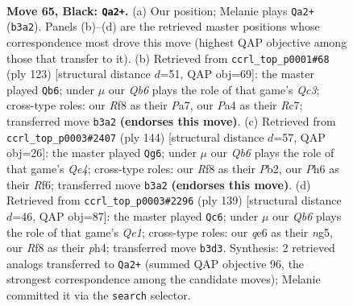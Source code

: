 \documentclass[11pt]{article}
\begin{document}
\clearpage

\begin{figure}[p]\centering
\begin{subfigure}{0.46\textwidth}\centering
\resizebox{\linewidth}{!}{%
\newchessgame
\chessboard[
  setfen={5r1r/p5p1/4Q2p/1k1p3P/p2P2P1/1q2P3/6KN/4b3 b - - 39 65},
  showmover=false,
  pgfstyle=straightmove, color=movearrow, markmove={b3-a2}
]}
\caption{}
\end{subfigure}\hfill
\begin{subfigure}{0.46\textwidth}\centering
\resizebox{\linewidth}{!}{%
\newchessgame
\chessboard[
  setfen={8/p1r1k1p1/P1q2p2/7P/4P3/3Q2P1/2p2P2/2R3K1 b - - 0 62},
  showmover=false,
  pgfstyle=straightmove, color=movearrow, markmove={c6-b6}
]}
\caption{}
\end{subfigure}
\\[4pt]
\begin{subfigure}{0.46\textwidth}\centering
\resizebox{\linewidth}{!}{%
\newchessgame
\chessboard[
  setfen={8/4q3/1k1pPR2/1np5/p3Q3/Pp1P4/1P6/2K5 w - - 1 73},
  showmover=false,
  pgfstyle=straightmove, color=movearrow, markmove={e4-g6}
]}
\caption{}
\end{subfigure}\hfill
\begin{subfigure}{0.46\textwidth}\centering
\resizebox{\linewidth}{!}{%
\newchessgame
\chessboard[
  setfen={4q1k1/4r3/4p3/1p2QpN1/p6P/P2P2P1/1P3P1K/8 b - - 28 70},
  showmover=false,
  pgfstyle=straightmove, color=movearrow, markmove={e8-c6}
]}
\caption{}
\end{subfigure}
\caption{\textbf{Move 65, Black: \texttt{Qa2+}.} (a) Our position; Melanie plays \texttt{Qa2+} (\texttt{b3a2}). Panels (b)--(d) are the retrieved master positions whose correspondence most drove this move (highest QAP objective among those that transfer to it). (b) Retrieved from \texttt{ccrl\_top\_p0001\#68} (ply 123) [structural distance $d$=51, QAP obj=69]: the master played \texttt{Qb6}; under $\mu$ our \emph{Qb6} plays the role of that game's \emph{Qc3}; cross-type roles: our \emph{R}f8 as their \emph{P}a7, our \emph{P}a4 as their \emph{R}c7; transferred move \texttt{b3a2} \textbf{(endorses this move)}. (c) Retrieved from \texttt{ccrl\_top\_p0003\#2407} (ply 144) [structural distance $d$=57, QAP obj=26]: the master played \texttt{Qg6}; under $\mu$ our \emph{Qb6} plays the role of that game's \emph{Qe4}; cross-type roles: our \emph{R}f8 as their \emph{P}b2, our \emph{P}h6 as their \emph{R}f6; transferred move \texttt{b3a2} \textbf{(endorses this move)}. (d) Retrieved from \texttt{ccrl\_top\_p0003\#2296} (ply 139) [structural distance $d$=46, QAP obj=87]: the master played \texttt{Qc6}; under $\mu$ our \emph{Qb6} plays the role of that game's \emph{Qe1}; cross-type roles: our \emph{q}e6 as their \emph{n}g5, our \emph{R}f8 as their \emph{p}h4; transferred move \texttt{b3d3}. Synthesis: 2 retrieved analogs transferred to \texttt{Qa2+} (summed QAP objective 96, the strongest correspondence among the candidate moves); Melanie committed it via the \texttt{search} selector.}
\label{fig:thought-m129}
\end{figure}
\end{document}
